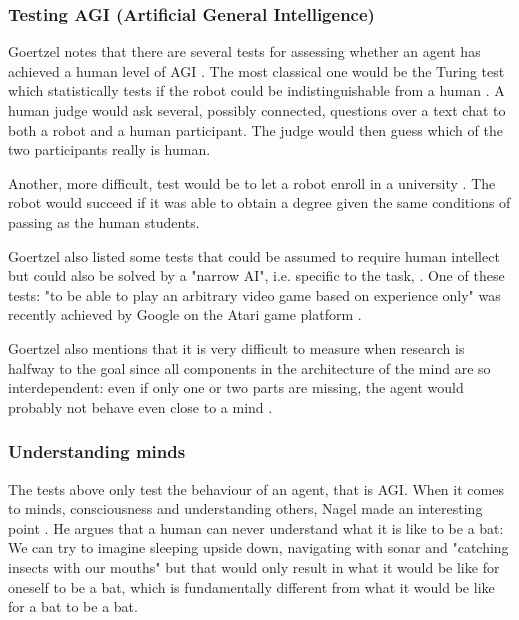 \documentclass[11pt]{article}
\newcommand{\dr}[1]{{\color{dark-cornflower-blue-2} #1}}
\newenvironment{sketch}{\color{dark-green-2}}{\ignorespacesafterend}
\begin{document}


\subsubsection*{Testing AGI (Artificial General Intelligence)}
Goertzel notes that there are several tests for assessing whether an agent has achieved a human level of AGI \cite{goertzel2012agi}. The most classical one would be the Turing test which statistically tests if the robot could be indistinguishable from a human \cite{turing1950computing}. A human judge would ask several, possibly connected, questions over a text chat to both a robot and a human participant. The judge would then guess which of the two participants really is human.

Another, more difficult, test would be to let a robot enroll in a university \cite{goertzel2012agi}. The robot would succeed if it was able to obtain a degree given the same conditions of passing as the human students.

Goertzel also listed some tests that could be assumed to require human intellect but could also be solved by a "narrow AI", i.e. specific to the task, \cite{goertzel2012agi}. One of these tests: "to be able to play an arbitrary video game based on experience only" was recently achieved by Google on the Atari game platform \cite{googleAtari}.

\dr{Goertzel also mentions that it is very difficult to measure when research is halfway to the goal since all components in the architecture of the mind are so interdependent: even if only one or two parts are missing, the agent would probably not behave even close to a mind \cite{goertzel2012agi}.} 

\subsubsection*{Understanding minds}

The tests above only test the behaviour of an agent, that is AGI. When it comes to minds, consciousness and understanding others, Nagel made an interesting point \cite{nagel1974like}. He argues that a human can never understand what it is like to be a bat: We can try to imagine sleeping upside down, navigating with sonar and "catching insects with our mouths" but that would only result in what it would be like for oneself to be a bat, which is fundamentally different from what it would be like for a bat to be a bat.
\end{document}
